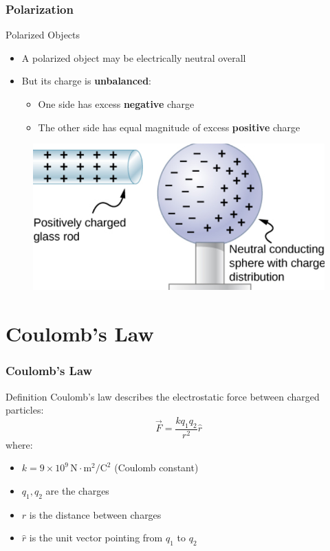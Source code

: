 \documentclass{beamer}
\begin{document}
\begin{frame}
    \frametitle{Polarization}
    \begin{block}{Polarized Objects}
        \begin{itemize}
            \item A polarized object may be electrically neutral overall
            \item But its charge is \textbf{unbalanced}:
                \begin{itemize}
                    \item One side has excess \textbf{negative} charge
                    \item The other side has equal magnitude of excess \textbf{positive} charge
                \end{itemize}
        \end{itemize}
    \end{block}
    
    
        \begin{figure}
            \centering
            \includegraphics[width=0.75\linewidth]{plpl.png}
        \end{figure}
    
\end{frame}

\section{Coulomb's Law}

\begin{frame}
    \frametitle{Coulomb's Law}
    \begin{block}{Definition}
        Coulomb's law describes the electrostatic force between charged particles:
        \begin{equation}
            \vec{F} = \frac{kq_1q_2}{r^2}\hat{r}
        \end{equation}
        where:
        \begin{itemize}
            \item $k = 9 \times 10^9 \, \text{N} \cdot \text{m}^2/\text{C}^2$ (Coulomb constant)
            \item $q_1, q_2$ are the charges
            \item $r$ is the distance between charges
            \item $\hat{r}$ is the unit vector pointing from $q_1$ to $q_2$
        \end{itemize}
    \end{block}
\end{frame}
\end{document}
